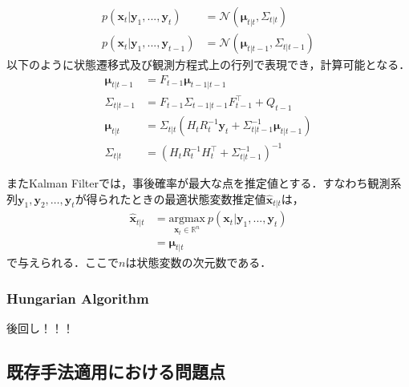         \begin{equation}
            \label{eq:normal_format}
            \begin{aligned}
                p(\left. \bm{x}_t \right| \bm{y}_1,..., \bm{y}_t ) &= \mathcal{N}(\bm{\mu}_{t|t}, \Sigma_{t|t})
                \\ p(\left.\bm{x}_t\right| \bm{y}_1,..., \bm{y}_{t-1}) &= \mathcal{N}(\bm{\mu}_{t|t-1}, \Sigma_{t|t-1})
            \end{aligned}
        \end{equation}
        以下のように状態遷移式及び観測方程式上の行列で表現でき，計算可能となる．
        \begin{equation}
            \begin{aligned}
                \bm{\mu}_{t|t-1} &= F_{t-1} \bm{\mu}_{t-1|t-1}
                \\\Sigma_{t|t-1} &= F_{t-1} \Sigma_{t-1|t-1} F_{t-1}^{\top} + Q_{t-1}
                \\\bm{\mu}_{t|t} &= \Sigma_{t|t} \left( H_t R_t^{-1} \bm{y}_t + \Sigma_{t|t-1}^{-1} \bm{\mu}_{t|t-1} \right)
                \\\Sigma_{t|t} &= \left( H_t R_t^{-1} H_t^{\top} + \Sigma_{t|t-1}^{-1}\right)^{-1}
            \end{aligned}                    
        \end{equation}

        またKalman Filterでは，事後確率が最大な点を推定値とする．すなわち観測系列$\bm{y}_1,\bm{y}_2,\dots,\bm{y}_t$が得られたときの最適状態変数推定値$\hat{\bm{x}}_{t|t}$は，
        \begin{equation}
            \begin{aligned}
                \hat{\bm{x}}_{t|t} &= \underset{\bm{x}_t \in \mathbb{R}^{n}}{\text{argmax}}\ p(\left. \bm{x}_t \right| \bm{y}_1,..., \bm{y}_t )
                \\ &= \bm{\mu}_{t|t}
            \end{aligned}
        \end{equation}
        で与えられる．ここで$n$は状態変数の次元数である．

        \subsubsection{Hungarian Algorithm}
        後回し！！！

    \subsection{既存手法適用における問題点}
    


